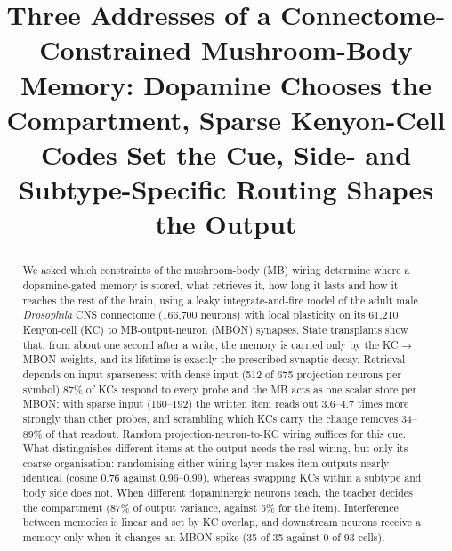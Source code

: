 \documentclass[conference]{IEEEtran}
\begin{document}
\title{Three Addresses of a Connectome-Constrained Mushroom-Body Memory:
Dopamine Chooses the Compartment, Sparse Kenyon-Cell Codes Set the Cue,
Side- and Subtype-Specific Routing Shapes the Output}

\author{
}

\maketitle

\begin{abstract}
We asked which constraints of the mushroom-body (MB) wiring determine where a
dopamine-gated memory is stored, what retrieves it, how long it lasts and how
it reaches the rest of the brain, using a leaky integrate-and-fire model of the
adult male \textit{Drosophila} CNS connectome (166{,}700 neurons) with local
plasticity on its 61{,}210 Kenyon-cell (KC) to MB-output-neuron (MBON)
synapses. State transplants show that, from about one second after a write,
the memory is carried only by the KC$\rightarrow$MBON weights, and its lifetime
is exactly the prescribed synaptic decay. Retrieval depends on input
sparseness: with dense input (512 of 675 projection neurons per symbol) 87\% of
KCs respond to every probe and the MB acts as one scalar store per MBON; with
sparse input (160--192) the written item reads out 3.6--4.7 times more
strongly than other probes, and scrambling which KCs carry the change removes
34--89\% of that readout. Random projection-neuron-to-KC wiring suffices for
this cue. What distinguishes different items at the output needs the real
wiring, but only its coarse organisation: randomising either wiring layer makes
item outputs nearly identical (cosine 0.76 against 0.96--0.99), whereas swapping
KCs within a subtype and body side does not. When different dopaminergic
neurons teach, the teacher decides the compartment (87\% of output variance,
against 5\% for the item). Interference between memories is linear and set by
KC overlap, and downstream neurons receive a memory only when it changes an
MBON spike (35 of 35 against 0 of 93 cells).
\end{abstract}

\end{document}
